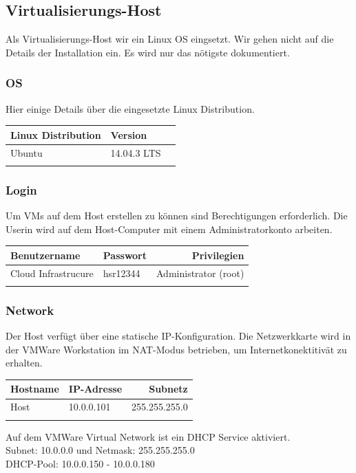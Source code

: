 \documentclass[a4,12pt]{scrartcl}
\begin{document}
\subsection{Virtualisierungs-Host}
Als Virtualisierungs-Host wir ein Linux OS eingsetzt. Wir gehen nicht auf die Details der Installation ein. Es wird nur das nötigste dokumentiert.  

\subsubsection{OS} 
Hier einige Details über die eingesetzte Linux Distribution. 
\begin{center}
    \begin{tabular}{@{} l l r@{}}\toprule    
    {Linux Distribution} & {Version}\\ \midrule
    Ubuntu & 14.04.3 LTS\\ \addlinespace
    \bottomrule
    \end{tabular}
\end{center}

\subsubsection{Login}
Um VMs auf dem Host erstellen zu können sind Berechtigungen erforderlich. Die Userin wird auf dem Host-Computer mit einem Administratorkonto arbeiten. 
\begin{center}
    \begin{tabular}{@{} l l r@{}}\toprule    
    {Benutzername} & {Passwort} & {Privilegien}\\ \midrule
    Cloud Infrastrucure & hsr12344 & Administrator (root)\\ \addlinespace
    \bottomrule
    \end{tabular}
\end{center}

\subsubsection{Network}
Der Host verfügt über eine statische IP-Konfiguration. Die Netzwerkkarte wird in der VMWare Workstation im NAT-Modus betrieben, um Internetkonektitivät zu erhalten.  
\begin{center}
    \begin{tabular}{@{} l l r@{}}\toprule    
    {Hostname} & {IP-Adresse} & {Subnetz}\\ \midrule
    Host & 10.0.0.101 & 255.255.255.0\\ \addlinespace
    \bottomrule
    \end{tabular}
\end{center}
Auf dem VMWare Virtual Network ist ein DHCP Service aktiviert. \\
Subnet: 10.0.0.0 und Netmask: 255.255.255.0 \\
DHCP-Pool: 10.0.0.150 - 10.0.0.180
\end{document}
